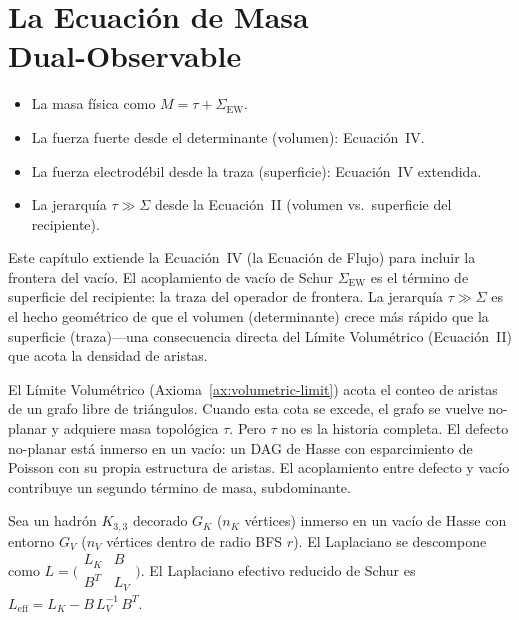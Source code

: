 \documentclass[11pt, a4paper, openany]{book}
\newenvironment{introduction}[1][Sinopsis del M\'odulo]{%
  \begin{tcolorbox}[
    enhanced,colback=structure!5,colframe=structure,
    colbacktitle=structure,coltitle=white,
    fonttitle=\small\bfseries,title={#1},
    arc=2pt,boxrule=0.7pt,
    left=8pt,right=8pt,top=6pt,bottom=6pt,
    before skip=12pt,after skip=12pt
  ]\itshape\begin{itemize}[leftmargin=*,itemsep=2pt,parsep=0pt]
}{%
  \end{itemize}\end{tcolorbox}
}
\begin{document}
\chapter[La Ecuaci\'on de Masa Dual-Observable]{La Ecuaci\'on de Masa\\Dual-Observable}

\begin{introduction}
  \item La masa f\'isica como $M = \tau + \Sigma_{\mathrm{EW}}$.
  \item La fuerza fuerte desde el determinante (volumen): Ecuaci\'on~IV.
  \item La fuerza electrod\'ebil desde la traza (superficie): Ecuaci\'on~IV extendida.
  \item La jerarqu\'ia $\tau \gg \Sigma$ desde la Ecuaci\'on~II (volumen vs.\ superficie del recipiente).
\end{introduction}

Este cap\'itulo extiende la Ecuaci\'on~IV (la Ecuaci\'on de Flujo) para
incluir la frontera del vac\'io. El acoplamiento de vac\'io de Schur
$\Sigma_{\mathrm{EW}}$ es el t\'ermino de superficie del recipiente:
la traza del operador de frontera. La jerarqu\'ia
$\tau \gg \Sigma$ es el hecho geom\'etrico de que el volumen
(determinante) crece m\'as r\'apido que la superficie (traza)---una
consecuencia directa del L\'imite Volum\'etrico (Ecuaci\'on~II) que
acota la densidad de aristas.

El L\'imite Volum\'etrico (Axioma~\ref{ax:volumetric-limit}) acota el
conteo de aristas de un grafo libre de tri\'angulos. Cuando esta cota se
excede, el grafo se vuelve no-planar y adquiere masa topol\'ogica
$\tau$. Pero $\tau$ no es la historia completa. El defecto no-planar
est\'a inmerso en un vac\'io: un DAG de Hasse con esparcimiento de
Poisson con su propia estructura de aristas. El acoplamiento entre
defecto y vac\'io contribuye un segundo t\'ermino de masa, subdominante.

\begin{definition}
Sea un hadr\'on $K_{3,3}$ decorado $G_K$ ($n_K$ v\'ertices) inmerso en
un vac\'io de Hasse con entorno $G_V$ ($n_V$ v\'ertices dentro de
radio BFS $r$). El Laplaciano se descompone como
$L = \bigl(\begin{smallmatrix} L_K & B \\ B^T & L_V
\end{smallmatrix}\bigr)$.
El Laplaciano efectivo reducido de Schur es
$L_{\mathrm{eff}} = L_K - B\, L_V^{-1}\, B^T$.
\end{definition}
\end{document}
